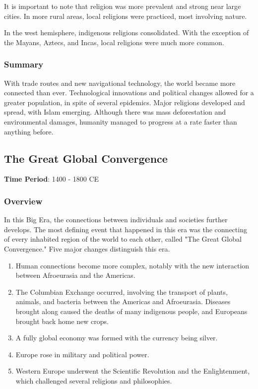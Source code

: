 \documentclass[11pt]{article}
\begin{document}
It is important to note that religion was more prevalent and strong near large cities. In more rural areas, local religions were practiced, most involving nature.

In the west hemisphere, indigenous religions consolidated. With the exception of the Mayans, Aztecs, and Incas, local religions were much more common.

\subsubsection{Summary}
\label{sec:orgeee626f}

With trade routes and new navigational technology, the world became more connected than ever. Technological innovations and political changes allowed for a greater population, in spite of several epidemics. Major religions developed and spread, with Islam emerging. Although there was mass deforestation and environmental damages, humanity managed to progress at a rate faster than anything before.
\subsection{The Great Global Convergence}
\label{sec:orgdc15969}

\textbf{Time Period}: 1400 - 1800 CE

\subsubsection{Overview}
\label{sec:orgd1550b5}

In this Big Era, the connections between individuals and societies further develops. The most defining event that happened in this era was the connecting of every inhabited region of the world to each other, called "The Great Global Convergence." Five major changes distinguish this era.

\begin{enumerate}
\item Human connections become more complex, notably with the new interaction between Afroeurasia and the Americas.
\item The Columbian Exchange occurred, involving the transport of plants, animals, and bacteria between the Americas and Afroeurasia. Diseases brought along caused the deaths of many indigenous people, and Europeans brought back home new crops.
\item A fully global economy was formed with the currency being silver.
\item Europe rose in military and political power.
\item Western Europe underwent the Scientific Revolution and the Enlightenment, which challenged several religions and philosophies.
\end{enumerate}
\end{document}
